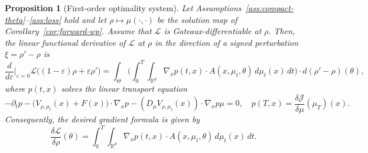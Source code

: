 \documentclass[11pt,a4wide]{article}
\newtheorem{proposition}[theorem]{Proposition}
\theoremstyle{definition}
\newcommand{\R}{\mathbb{R}}
\begin{document}
\begin{proposition}[First-order optimality system]
\label{prop:pmp}
Let Assumptions~\ref{ass:compact-theta}--\ref{ass:loss} hold and let $\rho\mapsto \mu(\cdot,\cdot)$ be the solution map of Corollary~\ref{cor:forward-wp}. Assume that $\mathcal L$ is Gateaux-differentiable at $\rho.$ Then, the linear functional derivative of $\mathcal L$ at $\rho$ in the direction of a signed perturbation $\xi=\rho'-\rho$ is
\begin{equation}
\frac{d}{d\varepsilon}\Big|_{\varepsilon=0} \mathcal L\big((1-\varepsilon)\rho+\varepsilon\rho'\big) = \int_\Theta \Big(\int_0^T\!\!\int_{\R^d} \nabla_x p(t,x)\cdot  A(x,\mu_t,\theta)\, d\mu_t(x)\,dt\Big)\cdot d(\rho'-\rho)(\theta),
\label{eq:gateaux}
\end{equation}
where $p(t,x)$ solves the linear transport equation
\begin{equation}
-\partial_t p - \big(V_{\rho,\mu_t}(x)+F(x)\big)\cdot\nabla_x p - (D_\mu V_{\rho,\mu_t}(x))\cdot \nabla_x p \mu = 0,
\quad p(T,x) = \frac{\delta\mathcal J}{\delta\mu}(\mu_T)(x).
\label{eq:adjoint}
\end{equation}
 Consequently, the desired gradient formula is given by 
\begin{equation}
\frac{\delta\mathcal L}{\delta\rho}(\theta) = \int_0^T\!\!\int_{\R^d}  \nabla_x p(t,x)\cdot A(x,\mu_t,\theta)\,d\mu_t(x)\,dt.
\label{eq:grad-rho}
\end{equation}
\end{proposition}
\end{document}

